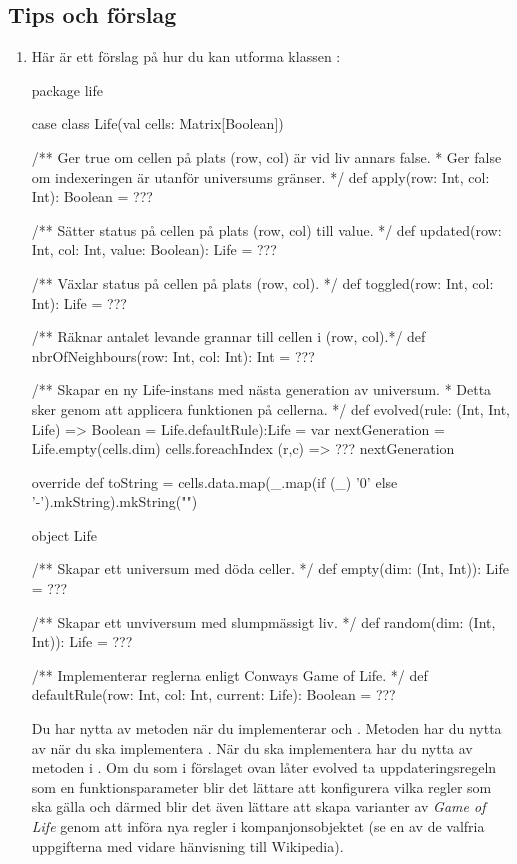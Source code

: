 \subsection{Tips och förslag}

\begin{enumerate}[leftmargin=*]
\item Här är ett förslag på hur du kan utforma klassen :
\begin{CodeSmall}
package life

case class Life(val cells: Matrix[Boolean]) {

  /** Ger true om cellen på plats (row, col) är vid liv annars false.
    * Ger false om indexeringen är utanför universums gränser.
    */
  def apply(row: Int, col: Int): Boolean = ???

  /** Sätter status på cellen på plats (row, col) till value. */
  def updated(row: Int, col: Int, value: Boolean): Life = ???

  /** Växlar status på cellen på plats (row, col). */
  def toggled(row: Int, col: Int): Life = ???

  /** Räknar antalet levande grannar till cellen i (row, col).*/
  def nbrOfNeighbours(row: Int, col: Int): Int = ???

  /** Skapar en ny Life-instans med nästa generation av universum.
    * Detta sker genom att applicera funktionen  på cellerna.
    */
  def evolved(rule: (Int, Int, Life) => Boolean = Life.defaultRule):Life = {
    var nextGeneration = Life.empty(cells.dim)
    cells.foreachIndex { (r,c) =>
      ???
    }
    nextGeneration
  }

  override def toString =
    cells.data.map(_.map(if (_) '0' else '-').mkString).mkString("\n")
}

object Life {
  /** Skapar ett universum med döda celler. */
  def empty(dim: (Int, Int)): Life = ???

  /** Skapar ett unviversum med slumpmässigt liv. */
  def random(dim: (Int, Int)): Life = ???

  /** Implementerar reglerna enligt Conways Game of Life. */
  def defaultRule(row: Int, col: Int, current: Life): Boolean = ???
}
\end{CodeSmall}
Du har nytta av metoden  när du implementerar  och . Metoden  har du nytta av när du ska implementera . När du ska implementera  har du nytta av metoden  i .
Om du som i förslaget ovan låter evolved ta uppdateringsregeln som en funktionsparameter blir det lättare att konfigurera vilka regler som ska gälla och därmed blir det även lättare att skapa varianter av \emph{Game of Life} genom att införa nya regler i kompanjonsobjektet (se en av de valfria uppgifterna med vidare hänvisning till Wikipedia).


\end{enumerate}
